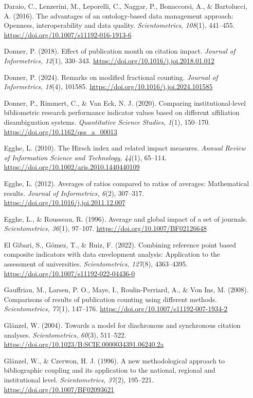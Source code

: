\documentclass[
  letterpaper,
]{scrreprt}
\begin{document}
Daraio, C., Lenzerini, M., Leporelli, C., Naggar, P., Bonaccorsi, A., \&
Bartolucci, A. (2016). The advantages of an ontology-based data
management approach: Openness, interoperability and data quality.
\emph{Scientometrics, 108}(1), 441--455.
\url{https://doi.org/10.1007/s11192-016-1913-6}

Donner, P. (2018). Effect of publication month on citation impact.
\emph{Journal of Informetrics, 12}(1), 330--343.
\url{https://doi.org/10.1016/j.joi.2018.01.012}

Donner, P. (2024). Remarks on modified fractional counting.
\emph{Journal of Informetrics, 18}(4), 101585.
\url{https://doi.org/10.1016/j.joi.2024.101585}

Donner, P., Rimmert, C., \& Van Eck, N. J. (2020). Comparing
institutional-level bibliometric research performance indicator values
based on different affiliation disambiguation systems.
\emph{Quantitative Science Studies, 1}(1), 150--170.
\url{https://doi.org/10.1162/qss_a_00013}

Egghe, L. (2010). The Hirsch index and related impact measures.
\emph{Annual Review of Information Science and Technology, 44}(1),
65--114. \url{https://doi.org/10.1002/aris.2010.1440440109}

Egghe, L. (2012). Averages of ratios compared to ratios of averages:
Mathematical results. \emph{Journal of Informetrics, 6}(2), 307--317.
\url{https://doi.org/10.1016/j.joi.2011.12.007}

Egghe, L., \& Rousseau, R. (1996). Average and global impact of a set of
journals. \emph{Scientometrics, 36}(1), 97--107.
\url{https://doi.org/10.1007/BF02126648}

El Gibari, S., Gómez, T., \& Ruiz, F. (2022). Combining reference point
based composite indicators with data envelopment analysis: Application
to the assessment of universities. \emph{Scientometrics, 127}(8),
4363--4395. \url{https://doi.org/10.1007/s11192-022-04436-0}

Gauffriau, M., Larsen, P. O., Maye, I., Roulin-Perriard, A., \& Von Ins,
M. (2008). Comparisons of results of publication counting using
different methods. \emph{Scientometrics, 77}(1), 147--176.
\url{https://doi.org/10.1007/s11192-007-1934-2}

Glänzel, W. (2004). Towards a model for diachronous and synchronous
citation analyses. \emph{Scientometrics, 60}(3), 511--522.
\url{https://doi.org/10.1023/B:SCIE.0000034391.06240.2a}

Glänzel, W., \& Czerwon, H. J. (1996). A new methodological approach to
bibliographic coupling and its application to the national, regional and
institutional level. \emph{Scientometrics, 37}(2), 195--221.
\url{https://doi.org/10.1007/BF02093621}
\end{document}
